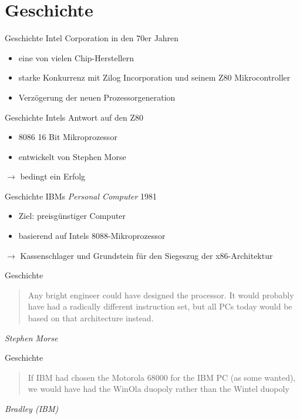 \section{Geschichte}

\begin{frame}{Geschichte}
	Intel Corporation in den 70er Jahren
	\begin{itemize}
		\item eine von vielen Chip-Herstellern
		\item starke Konkurrenz mit Zilog Incorporation und seinem Z80 Mikrocontroller
		\item Verzögerung der neuen Prozessorgeneration
	\end{itemize}
\end{frame}

\begin{frame}{Geschichte}
	Intels Antwort auf den Z80	
	\begin{itemize}
		\item 8086 16 Bit Mikroprozessor
	 	\item entwickelt von Stephen Morse 
	\end{itemize}

	$\rightarrow$ bedingt ein Erfolg
\end{frame}

\begin{frame}{Geschichte}
	IBMs \textit{Personal Computer}	1981
	\begin{itemize}
		\item Ziel: preisgünstiger Computer
		\item basierend auf Intels 8088-Mikroprozessor
	\end{itemize}

	$\rightarrow$ Kassenschlager und Grundstein für den Siegeszug der x86-Architektur 
\end{frame}

\begin{frame}{Geschichte}
	\begin{quote}
	Any bright engineer could have designed the processor. It would probably have had a radically different instruction set, but all PCs today would be based on that architecture instead.
	\end{quote}
	\textit{Stephen Morse}
\end{frame}

\begin{frame}{Geschichte}
	\begin{quote}
	If IBM had chosen the Motorola 68000 for the IBM PC (as some wanted), we would have had the WinOla duopoly rather than the Wintel duopoly
	\end{quote}
	\textit{Bradley (IBM)}
\end{frame}
